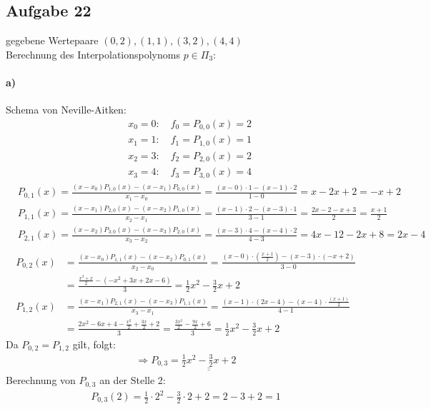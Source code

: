 \subsection*{Aufgabe 22}
gegebene Wertepaare $(0,2), (1,1), (3,2), (4,4)$\\
Berechnung des Interpolationspolynoms $p\in \Pi_3$:

\paragraph*{a)}
Schema von Neville-Aitken:\\
\begin{align*}
&x_0=0: \quad f_0=P_{0,0}(x)=2\\
&x_1=1: \quad f_1=P_{1,0}(x)=1\\
&x_2=3: \quad f_2=P_{2,0}(x)=2\\
&x_3=4: \quad f_3=P_{3,0}(x)=4
\end{align*}
\begin{align*}
&P_{0,1}(x)=\frac{(x-x_0)P_{1,0}(x)-(x-x_1)P_{0,0}(x)}{x_1-x_0}=\frac{(x-0)\cdot 1 -(x-1)\cdot2}{1-0}= x-2x+2=-x+2\\
&P_{1,1}(x)=\frac{(x-x_1)P_{2,0}(x)-(x-x_2)P_{1,0}(x)}{x_2-x_1}=\frac{(x-1)\cdot 2 -(x-3)\cdot 1}{3-1}= \frac{2x-2-x+3}{2}=\frac{x+1}{2}\\
&P_{2,1}(x)=\frac{(x-x_2)P_{3,0}(x)-(x-x_3)P_{2,0}(x)}{x_3-x_2}=\frac{(x-3)\cdot 4 -(x-4)\cdot 2}{4-3}= 4x-12-2x+8=2x-4\\
\end{align*}
\begin{align*}
P_{0,2}(x)&=\frac{(x-x_0)P_{1,1}(x)-(x-x_2)P_{0,1}(x)}{x_2-x_0}=\frac{(x-0)\cdot (\frac{x+1}{2}) -(x-3) \cdot(-x+2)}{3-0}\\ &=\frac{\frac{x^2+x}{2}-(-x^2+3x+2x-6)}{3}=\frac{1}{2}x^2-\frac{3}{2}x+2\\
P_{1,2}(x)&=\frac{(x-x_1)P_{2,1}(x)-(x-x_3)P_{1,1}(x)}{x_3-x_1}=\frac{(x-1)\cdot (2x-4) -(x-4) \cdot\frac{(x+1)}{2}}{4-1}\\ &=\frac{2x^2-6x+4-\frac{x^2}{2}+\frac{3x}{2}+2}{3}=\frac{\frac{3x^2}{2}-\frac{9x}{2}+6}{3}=\frac{1}{2}x^2-\frac{3}{2}x+2
\end{align*}
Da $P_{0,2}=P_{1,2}$ gilt, folgt:
\begin{align*}
\Rightarrow P_{0,3}=\underline{\underline{\frac{1}{2}x^2-\frac{3}{2}x+2}}
\end{align*}
Berechnung von $P_{0,3}$ an der Stelle 2:
\begin{align*}
P_{0,3}(2)=\frac{1}{2}\cdot 2^2-\frac{3}{2}\cdot 2+2=2-3+2=1
\end{align*}
